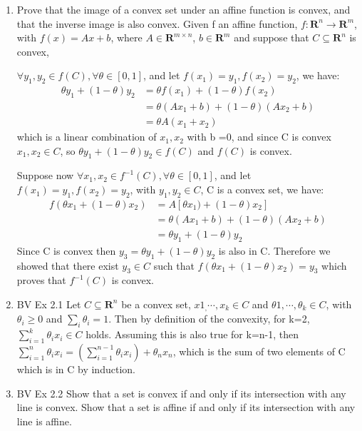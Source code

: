 \documentclass[10pt]{article}
\newcommand{\0}{\mat{0}}
\begin{document}
\begin{enumerate}
\item Prove that the image of a convex set under an affine function is convex, and that the inverse image is also convex.
Given f an affine function, $f: \mathbf{R}^n \rightarrow \mathbf{R}^m$,
with $f(x)=Ax + b$, where $A  \in \mathbf{R}^{m \times n}$, $b \in \mathbf{R}^m$ and suppose that $C \subseteq  \mathbf{R}^{n}$ is convex,

$\forall y_1, y_2 \in f(C), \forall \theta \in [0, 1]$, and let $f(x_1)=y_1, f(x_2) = y_2$, we have: 
\begin{align*}
	\theta y_1  + (1-\theta) y_2 	&= \theta f(x_1)  + (1-\theta) f(x_2) \\
							&= \theta (A x_1 + b) + (1-\theta) (A x_2 + b) \\
							&= \theta  A (x_1 + x_2)
\end{align*}
which is a linear combination of $x_1, x_2$ with b =0, and since C is convex $x_1, x_2 \in C$, so $\theta y_1  + (1-\theta) y_2 \in f(C)$ and $f(C)$ is convex.

Suppose now $\forall x_1, x_2 \in f^{-1}(C), \forall \theta \in [0, 1]$, and let $f(x_1)=y_1, f(x_2) = y_2$, with $y_1, y_2 \in C$, C is a convex set, we have: 
\begin{align*}
	f(\theta x_1  + (1-\theta) x_2) 	&= A [\theta x_1)  + (1-\theta) x_2]\\
							&= \theta (A x_1 + b) + (1-\theta) (A x_2 + b) \\
							&= \theta  y_1 + (1-\theta) y_2
\end{align*}
Since C is convex then $y_3 =\theta  y_1 + (1-\theta) y_2$ is also in C. Therefore we showed that there exist $y_3 \in C$ such that $f(\theta x_1  + (1-\theta) x_2) = y_3$
which proves that $f^{-1}(C)$ is convex.

\item BV Ex 2.1
Let $C \subseteq  \mathbf{R}^{n}$ be a convex set, $x1_, \cdots, x_k \in C$ and  $\theta1, \cdots, \theta_k \in C$, with $\theta_i \ge 0$ and $\sum_i \theta_i = 1$.
Then by definition of the convexity, for k=2, $\sum_{i=1}^k \theta_i x_i \in C$ holds. Assuming this is also true for k=n-1, then $\sum_{i=1}^n \theta_i x_i = (\sum_{i=1}^{n-1} \theta_i x_i) + \theta_n x_n$, 
which is the sum of two elements of C which is in C by induction.

\item BV Ex 2.2
Show that a set is convex if and only if its intersection with any line is convex. Show that a set is affine if and only if its intersection with any line is affine.


\end{enumerate}
\end{document}
